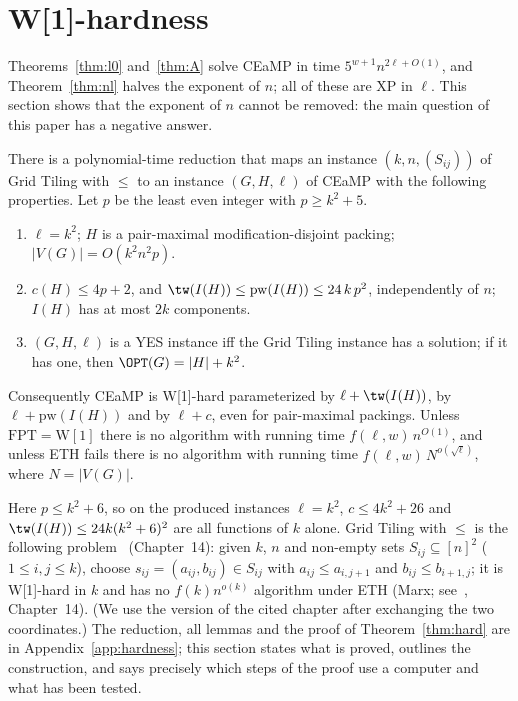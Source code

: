 \section{W[1]-hardness}\label{sec:hardness}
Theorems~\ref{thm:l0} and~\ref{thm:A} solve CEaMP in time $5^{w+1}n^{2\ell+O(1)}$, and Theorem~\ref{thm:nl} halves the exponent of $n$; all of these are XP in $\ell$. This section shows that the exponent of $n$ cannot be removed: the main question of this paper has a negative answer.
\begin{theorem}[{W[1]}-hardness]\label{thm:hard}
There is a polynomial-time reduction that maps an instance $(k,n,(S_{ij}))$ of Grid Tiling with $\le$ to an instance $(G,H,\ell)$ of CEaMP with the following properties. Let $p$ be the least even integer with $p\ge k^2+5$.
\begin{enumerate}
\item[(i)] $\ell=k^2$; $H$ is a pair-maximal modification-disjoint packing; $|V(G)|=O(k^2n^2p)$.
\item[(ii)] $c(H)\le 4p+2$, and $\tw(I(H))\le\mathrm{pw}(I(H))\le 24\,k\,p^2$, independently of $n$; $I(H)$ has at most $2k$ components.
\item[(iii)] $(G,H,\ell)$ is a YES instance iff the Grid Tiling instance has a solution; if it has one, then $\OPT(G)=|H|+k^2$.
\end{enumerate}
Consequently CEaMP is W[1]-hard parameterized by $\ell+\tw(I(H))$, by $\ell+\mathrm{pw}(I(H))$ and by $\ell+c$, even for pair-maximal packings. Unless $\mathrm{FPT}=\mathrm{W[1]}$ there is no algorithm with running time $f(\ell,w)\,n^{O(1)}$, and unless ETH fails there is no algorithm with running time $f(\ell,w)\,N^{o(\sqrt{\ell})}$, where $N=|V(G)|$.
\end{theorem}
Here $p\le k^2+6$, so on the produced instances $\ell=k^2$, $c\le 4k^2+26$ and $\tw(I(H))\le 24k(k^2+6)^2$ are all functions of $k$ alone. Grid Tiling with $\le$ is the following problem~\cite{Cygan15} (Chapter~14): given $k$, $n$ and non-empty sets $S_{ij}\subseteq[n]^2$ ($1\le i,j\le k$), choose $s_{ij}=(a_{ij},b_{ij})\in S_{ij}$ with $a_{ij}\le a_{i,j+1}$ and $b_{ij}\le b_{i+1,j}$; it is W[1]-hard in $k$ and has no $f(k)n^{o(k)}$ algorithm under ETH (Marx; see~\cite{Cygan15}, Chapter~14). (We use the version of the cited chapter after exchanging the two coordinates.) The reduction, all lemmas and the proof of Theorem~\ref{thm:hard} are in Appendix~\ref{app:hardness}; this section states what is proved, outlines the construction, and says precisely which steps of the proof use a computer and what has been tested.

